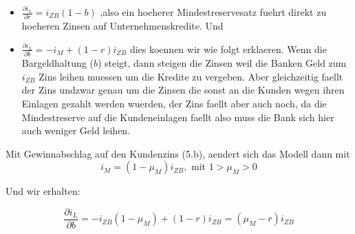 \documentclass[a4paper]{article}
\begin{document}
\begin{itemize}
	\item $\frac{ \partial i_L }{ \partial r } = i_{ZB} (1 - b)$
	      ,also ein hoeherer Mindestreservesatz fuehrt direkt
	      zu hoeheren Zinsen auf Unternehmenskredite. Und

	\item $\frac{ \partial i_L }{ \partial b } = -i_M + (1 - r) i_{ZB}$
	      dies koennen wir wie folgt erklaeren. Wenn die Bargeldhaltung ($b$)
	      steigt, dann steigen die Zinsen weil die Banken Geld zum $i_{ZB}$
	      Zins leihen muessen um die Kredite zu vergeben. Aber gleichzeitig
	      faellt der Zins undzwar genau um die Zinsen die sonst an die Kunden
	      wegen ihren Einlagen gezahlt werden wuerden, der Zins faellt aber auch
	      noch, da die Mindestreserve auf die Kundeneinlagen faellt also muss die
	      Bank sich hier auch weniger Geld leihen.
\end{itemize}

Mit Gewinnabschlag auf den Kundenzins (5.b), aendert sich das Modell dann mit
\[
	i_M = (1 - \mu_M) i_{ZB}, \text{ mit } 1 > \mu_M > 0
\]

Und wir erhalten:

\[
	\frac{ \partial i_L }{ \partial b } =
	- i_{ZB} (1 - \mu_M) + (1 - r) i_{ZB} =
	(\mu_M - r) i_{ZB}
\]
\end{document}
